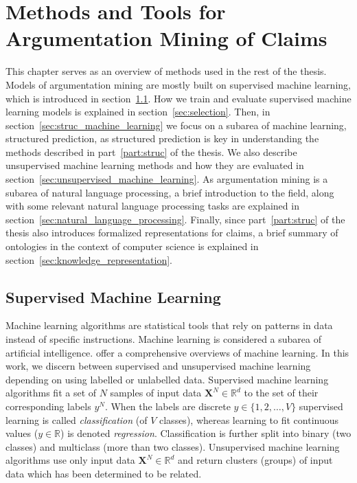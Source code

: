 \chapter{Methods and Tools for Argumentation Mining of Claims}
\label{chap:methods}

This chapter serves as an overview of methods used in the rest of the thesis.
Models of argumentation mining are mostly built on supervised machine learning,
which is introduced in section~\ref{sec:unstruc_machine_learning}.  How we
train and evaluate supervised machine learning models is explained in
section~\ref{sec:selection}.  Then, in section~\ref{sec:struc_machine_learning}
we focus on a subarea of machine learning, structured prediction, as structured
prediction is key in understanding the methods described in
part~\ref{part:struc} of the thesis. We also describe unsupervised machine
learning methods and how they are evaluated in
section~\ref{sec:unsupervised_machine_learning}.  As argumentation mining is a
subarea of natural language processing, a brief introduction to the field,
along with some relevant natural language processing tasks are explained in
section~\ref{sec:natural_language_processing}. Finally, since 
part~\ref{part:struc} of the thesis
also introduces formalized representations for claims, a
brief summary of ontologies in the context of computer science is
explained in section~\ref{sec:knowledge_representation}. 

\section{Supervised Machine Learning}
\label{sec:unstruc_machine_learning}

Machine learning algorithms are statistical tools that rely on patterns in data
instead of specific instructions. Machine learning is considered a subarea of
artificial intelligence. \citep{russell2016artificial, bishop2006pattern} offer
a comprehensive overviews of machine learning.  In this work, we discern between
supervised and unsupervised machine learning depending on using labelled or
unlabelled data.  
Supervised machine learning algorithms fit a set of $N$
samples of input data $\textbf{X}^N \in \mathbb{R}^d$ to the set of their
corresponding labels $y^N $. When the labels are discrete $y \in \{1, 2, \dots ,
V\}$ supervised learning is called \emph{classification} (of $V$ classes), whereas
learning to fit continuous values ($y \in \mathbb{R}$) is denoted \emph{regression}. 
Classification is further split into binary (two classes) and multiclass (more
than two classes).  Unsupervised machine learning algorithms use only input
data $\textbf{X}^N \in \mathbb{R}^d$ and return clusters (groups) of input data
which has been determined to be related. 

